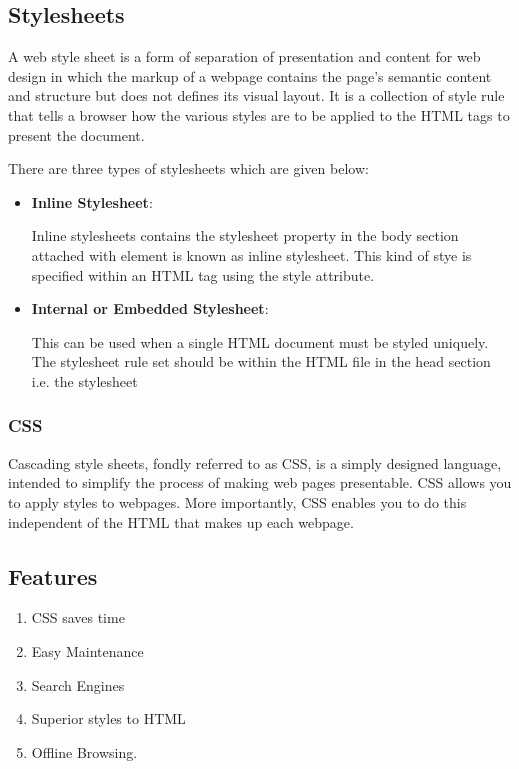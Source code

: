 \documentclass[a4paper]{article}
\begin{document}
  \subsection{Stylesheets}%
  A web style sheet is a form of separation of presentation and content
  for web design in which the markup of a webpage contains the page's 
  semantic content and structure but does not defines its visual layout.
  It is a collection of style rule that tells a browser how the various 
  styles are to be applied to the HTML tags to present the document.

  There are three types of stylesheets which are given below:
  \begin{itemize}
    \item \textbf{Inline Stylesheet}:

      Inline stylesheets contains the 
      stylesheet property in the body section attached with element
      is known as inline stylesheet. This kind of stye is specified
      within an HTML tag using the style attribute.

    \item \textbf{Internal or Embedded Stylesheet}:

      This can be used when a single HTML document must be styled 
      uniquely. The stylesheet rule set should be within the HTML file in 
      the head section i.e. the stylesheet

      
  \end{itemize}

    \subsubsection{CSS}
    Cascading style sheets, fondly referred to as CSS, is a simply 
    designed language, intended to simplify the process of making 
    web pages presentable. CSS allows you to apply styles to webpages.
    More importantly, CSS enables you to do this independent of the 
    HTML that makes up each webpage.
      \subsection{Features}
      \begin{enumerate}
        \item CSS saves time
        \item Easy Maintenance
        \item Search Engines
        \item Superior styles to HTML
        \item Offline Browsing.
      \end{enumerate}%
\end{document}
